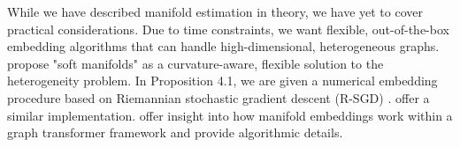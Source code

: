 \documentclass[twoside,11pt]{article}
\begin{document}
While we have described manifold estimation in theory, we have yet to cover practical considerations. Due to time constraints, we want flexible, out-of-the-box embedding algorithms that can handle high-dimensional, heterogeneous graphs.  \citet{digiovanni_etal_2022} propose "soft manifolds" as a curvature-aware, flexible solution to the heterogeneity problem. In \citet{digiovanni_etal_2022} Proposition 4.1, we are given a numerical embedding procedure based on Riemannian stochastic gradient descent (R-SGD) \citep{bonnabel_2013}. \citet{marinoni_etal_2023} offer a similar implementation. \citet{jyothish_jannesari_2025} offer insight into how manifold embeddings work within a graph transformer framework and provide algorithmic details. 


\newpage 

\end{document}
